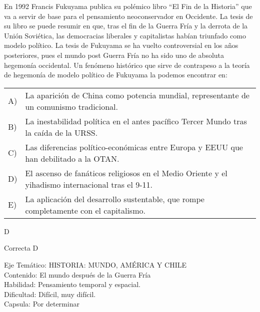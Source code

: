 \documentclass[letterpaper,11pt]{article}
\newcommand{\anchopregunta}{0.9\textwidth}
\begin{document}
\begin{enumerate}
\begin{minipage}{\anchopregunta}
\item En 1992 Francis Fukuyama publica su polémico libro ``El Fin de la Historia'' que va a servir de base para el pensamiento neoconservador en Occidente. La tesis de su libro se puede resumir en que, tras el fin de la Guerra Fría y la derrota de la Unión Soviética, las democracias liberales y capitalistas habían triunfado como modelo político. La tesis de Fukuyama se ha vuelto controversial en los años posteriores, pues el mundo post Guerra Fría no ha sido uno de absoluta hegemonía occidental. Un fenómeno histórico que sirve de contrapeso a la teoría de hegemonía de modelo político de Fukuyama la podemos encontrar en: 
\begin{flushleft}\begin{tabular}{@{\hspace{-.001\textwidth}}l@{\hspace{2pt}}p{}}
A)& La aparición de China como potencia mundial, representante de un comunismo tradicional.\\
B)& La inestabilidad política en el antes pacífico Tercer Mundo tras la caída de la URSS.\\
C)& Las diferencias político-económicas entre Europa y EEUU que han debilitado a la OTAN.\\
D)& El ascenso de fanáticos religiosos en el Medio Oriente y el yihadismo internacional tras el 9-11.\\
E)& La aplicación del desarrollo sustentable, que rompe completamente con el capitalismo.\\ 
\end{tabular}\end{flushleft}%
\begin{key} D
\end{key} 
\begin{hint}
\end{hint}
\begin{answer} Correcta D \\
\end{answer}
\begin{info} %
\begin{flushleft}
Eje Temático: HISTORIA: MUNDO, AMÉRICA Y CHILE\\
Contenido: El mundo después de la Guerra Fría\\
Habilidad: Pensamiento temporal y espacial.\\
Dificultad: Difícil, muy difícil.\\
Capsula: Por determinar \\
\end{flushleft} 
\end{info}
\end{minipage}\vfill$\;$ %


\end{enumerate}
\end{document}
